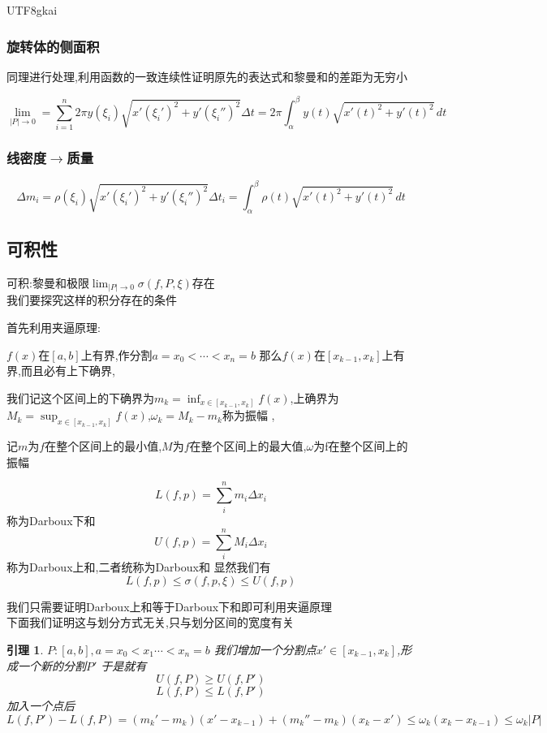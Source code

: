 \documentclass{article}
\newtheorem{lemma}{引理}[subsection]
\newenvironment{identification}{%
\heiti{定义}\kaishu
}{%
}
\begin{document}
\begin{CJK}{UTF8}{gkai}
\subsubsection{旋转体的侧面积}
同理进行处理,利用函数的一致连续性证明原先的表达式和黎曼和的差距为无穷小

\[\lim_{|P|\to 0} = \sum_{i = 1}^{n} 2\pi y(\xi_i)\sqrt{x'(\xi_i')^2 + y'(\xi_i'')^2} \Delta t = 2 \pi \int_{\alpha}^{\beta}y(t)\sqrt{x'(t)^2 + y'(t)^2}\, dt\]

\subsubsection{线密度$\rightarrow$质量}
\[\Delta m_i = \rho(\xi_i)\sqrt{x'(\xi_i')^2 + y'(\xi_i'')^2}\Delta t_i = \int_{\alpha}^{\beta} \rho(t) \sqrt{x'(t)^2 + y'(t)^2}\, dt\]

\subsection{可积性}
可积:黎曼和极限$\lim_{|P|\to 0} \sigma(f,P,\xi)$存在\\

我们要探究这样的积分存在的条件

首先利用夹逼原理:

$f(x)$在$[a,b]$上有界,作分割$a = x_0 < \cdots < x_n = b$
那么$f(x)$在$[x_{k - 1},x_k]$上有界,而且必有上下确界,

我们记这个区间上的下确界为$m_k = \inf_{x\in[x_{k - 1},x_k]}f(x)$,上确界为$M_k = \sup_{x\in[x_{k - 1},x_k]}f(x)$,$\omega_k = M_k - m_k$称为振幅
,

记$m$为$f$在整个区间上的最小值,$M$为$f$在整个区间上的最大值,$\omega$为f在整个区间上的振幅

\begin{identification}
\[L(f,p) = \sum_{i}^{n}m_i \Delta x_i\]
称为Darboux下和
\[U(f,p) = \sum_{i}^{n}M_i \Delta x_i\]
称为Darboux上和,二者统称为Darboux和
\end{identification}
显然我们有
\[L(f,p) \leq \sigma(f,p,\xi) \leq U(f,p)\]

我们只需要证明Darboux上和等于Darboux下和即可利用夹逼原理\\

下面我们证明这与划分方式无关,只与划分区间的宽度有关

\begin{lemma}
  $P:[a,b], a = x_0 < x_1 \cdots < x_n = b$
  我们增加一个分割点$x'\in[x_{k - 1},x_{k}]$,形成一个新的分割$P'$
于是就有
  \[U(f,P) \geq U(f,P')\]
  \[L(f,P) \leq L(f,P')\]
  加入一个点后
  \[L(f,P') - L(f,P) = (m_k' - m_k)(x' - x_{k - 1}) + (m_k'' - m_k)(x_{k} - x') \leq \omega_k(x_k - x_{k - 1}) \leq \omega_k |P|\]


\end{lemma}
\end{CJK}
\end{document}
